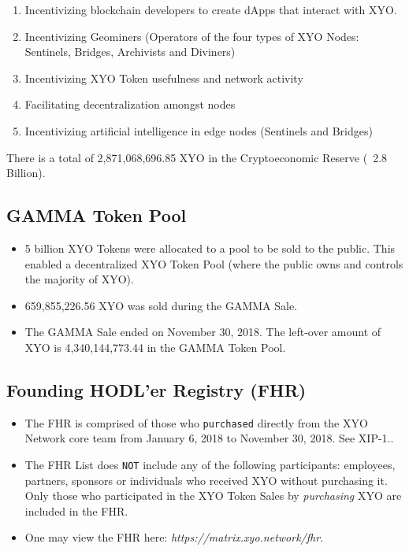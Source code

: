 \documentclass{article}
\begin{document}
\begin{enumerate}
  \item Incentivizing blockchain developers to create dApps that interact with XYO.
  \item Incentivizing Geominers (Operators of the four types of XYO Nodes: Sentinels, Bridges, Archivists and Diviners)
  \item Incentivizing XYO Token usefulness and network activity
  \item Facilitating decentralization amongst nodes
  \item Incentivizing artificial intelligence in edge nodes (Sentinels and Bridges)
\end{enumerate}


There is a total of 2,871,068,696.85 XYO in the Cryptoeconomic Reserve (~2.8 Billion).

\subsection{GAMMA Token Pool}

\begin{itemize}
	\item 5 billion XYO Tokens were allocated to a pool to be sold to the public. This enabled a decentralized XYO Token Pool (where the public owns and controls the majority of XYO).
	\item  659,855,226.56 XYO was sold during the GAMMA Sale.
	\item  The GAMMA Sale ended on November 30, 2018. The left-over amount of XYO is 4,340,144,773.44 in the GAMMA Token Pool.
\end{itemize}


\subsection{Founding HODL'er Registry (FHR)}

\begin{itemize}
	\item The FHR is comprised of those who \texttt{purchased} directly from the XYO Network core team from January 6, 2018 to November 30, 2018. See XIP-1.\cite{xip-1}.
	\item  The FHR List does \texttt{NOT} include any of the following participants: employees, partners, sponsors or individuals who received XYO without purchasing it. Only those who participated in the XYO Token Sales by \textit{purchasing} XYO are included in the FHR.
	\item One may view the FHR here: \textit{https://matrix.xyo.network/fhr}.
\end{itemize}
\end{document}
